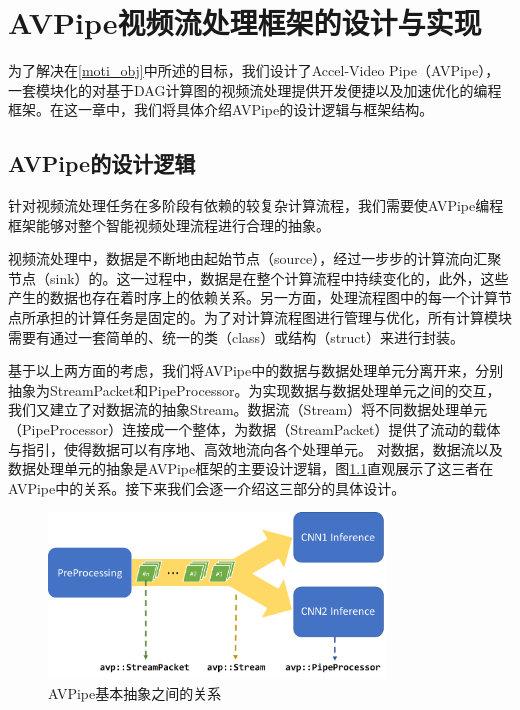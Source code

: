 
\chapter{AVPipe视频流处理框架的设计与实现}
为了解决在\ref{moti_obj}中所述的目标，我们设计了Accel-Video Pipe（AVPipe），一套模块化的对基于DAG计算图的视频流处理提供开发便捷以及加速优化的编程框架。在这一章中，我们将具体介绍AVPipe的设计逻辑与框架结构。

\section{AVPipe的设计逻辑}
针对视频流处理任务在多阶段有依赖的较复杂计算流程，我们需要使AVPipe编程框架能够对整个智能视频处理流程进行合理的抽象。\par
视频流处理中，数据是不断地由起始节点（source），经过一步步的计算流向汇聚节点（sink）的。这一过程中，数据是在整个计算流程中持续变化的，此外，这些产生的数据也存在着时序上的依赖关系。另一方面，处理流程图中的每一个计算节点所承担的计算任务是固定的。为了对计算流程图进行管理与优化，所有计算模块需要有通过一套简单的、统一的类（class）或结构（struct）来进行封装。\par
基于以上两方面的考虑，我们将AVPipe中的数据与数据处理单元分离开来，分别抽象为StreamPacket和PipeProcessor。为实现数据与数据处理单元之间的交互，我们又建立了对数据流的抽象Stream。数据流（Stream）将不同数据处理单元（PipeProcessor）连接成一个整体，为数据（StreamPacket）提供了流动的载体与指引，使得数据可以有序地、高效地流向各个处理单元。 对数据，数据流以及数据处理单元的抽象是AVPipe框架的主要设计逻辑，图\ref{fig:base_struct}直观展示了这三者在AVPipe中的关系。接下来我们会逐一介绍这三部分的具体设计。
\begin{figure}[htp]
    \centering
    \includegraphics[width=0.8\textwidth]{figure/avp_base_struct.pdf}
    \caption{AVPipe基本抽象之间的关系}
    \label{fig:base_struct}
\end{figure}
